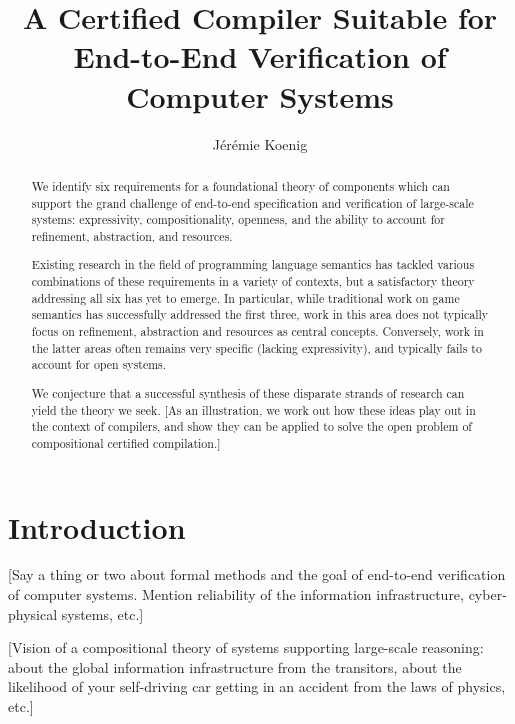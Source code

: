 \documentclass[sigplan,10pt,review,anonymous]{acmart}
\begin{document}
\title{A Certified Compiler Suitable for End-to-End Verification of Computer Systems}

\author{J\'er\'emie Koenig}

\begin{abstract} %
We identify six requirements
for a foundational theory of components
which can support the grand challenge of
end-to-end specification and verification of large-scale systems:
expressivity,
compositionality,
openness,
and the ability to account for
refinement,
abstraction,
and resources.

Existing research
in the field of programming language semantics
has tackled various combinations of these requirements
in a variety of contexts,
but a satisfactory theory addressing all six has yet to emerge.
In particular,
while traditional work on game semantics
has successfully addressed the first three,
work in this area does not typically focus
on refinement, abstraction and resources as central concepts.
Conversely,
work in the latter areas
often remains very specific (lacking expressivity),
and typically fails to account for open systems.

We conjecture that
a successful synthesis of these disparate strands of research
can yield the theory we seek.
[As an illustration,
we work out how these ideas play out in the context of compilers,
and show they can be applied
to solve the open problem of compositional certified compilation.]
\end{abstract}

\maketitle

\section{Introduction} %

[Say a thing or two about formal methods and
the goal of end-to-end verification of computer systems.
Mention reliability of the information infrastructure,
cyber-physical systems, etc.]

[Vision of a compositional theory of systems
supporting large-scale reasoning:
about the global information infrastructure from the transitors,
about the likelihood of your self-driving car getting in an accident
from the laws of physics, etc.]
\end{document}
